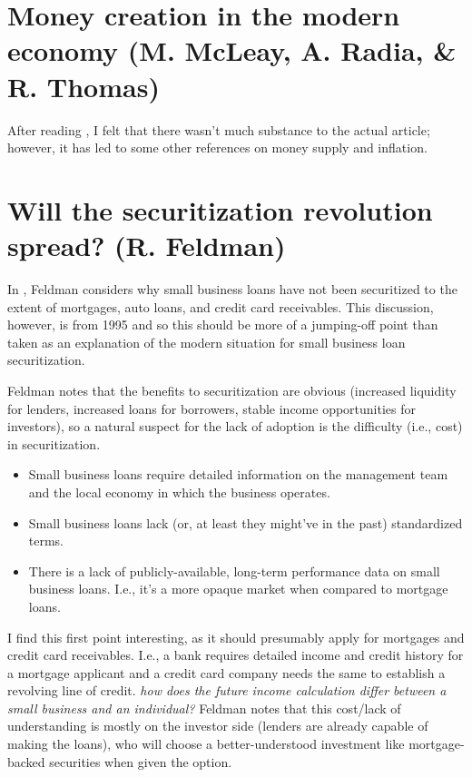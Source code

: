 \documentclass{article}
\begin{document}



\section{Money creation in the modern economy (M. McLeay, A. Radia, \& R. Thomas)}

After reading \cite{BOE2014}, I felt that there wasn't much substance to the actual article; however, it has led to some other references on money supply and inflation.


\section{Will the securitization revolution spread? (R. Feldman)}

In \cite{Feldman1995}, Feldman considers why small business loans have not been securitized to the extent of mortgages, auto loans, and credit card receivables.  This discussion, however, is from 1995 and so this should be more of a jumping-off point than taken as an explanation of the modern situation for small business loan securitization.

Feldman notes that the benefits to securitization are obvious (increased liquidity for lenders, increased loans for borrowers, stable income opportunities for investors), so a natural suspect for the lack of adoption is the difficulty (i.e., cost) in securitization.
\begin{itemize}
    \item Small business loans require detailed information on the management team and the local economy in which the business operates.
    \item Small business loans lack (or, at least they might've in the past) standardized terms.
    \item There is a lack of publicly-available, long-term performance data on small business loans.  I.e., it's a more opaque market when compared to mortgage loans.
\end{itemize}

I find this first point interesting, as it should presumably apply for mortgages and credit card receivables.  I.e., a bank requires detailed income and credit history for a mortgage applicant and a credit card company needs the same to establish a revolving line of credit.  \note{[Consider]:} {\it how does the future income calculation differ between a small business and an individual?}  Feldman notes that this cost/lack of understanding is mostly on the investor side (lenders are already capable of making the loans), who will choose a better-understood investment like mortgage-backed securities when given the option.
\end{document}
